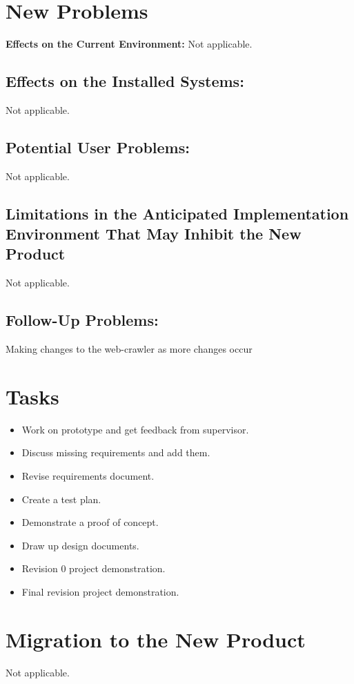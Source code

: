 \documentclass[titlepage]{article}
\begin{document}
\section{New Problems }
\textbf{Effects on the Current Environment:}
Not applicable.

\subsection*{Effects on the Installed Systems:}
Not applicable.

\subsection*{Potential User Problems:}
Not applicable.

\subsection*{Limitations in the Anticipated Implementation Environment That May Inhibit the New Product}

Not applicable.

\subsection*{Follow-Up Problems:}
Making changes to the web-crawler as more changes occur 

\section{Tasks} 

\begin{itemize}
  \item Work on prototype and get feedback from supervisor.
  \item Discuss missing requirements and add them.
     \item Revise requirements document.
  \item Create a test plan.
  \item Demonstrate a proof of concept.
  \item Draw up design documents.
  \item Revision 0 project demonstration.
\item Final revision project demonstration.
\end{itemize}

\section{Migration to the New Product }
Not applicable.
\end{document}
